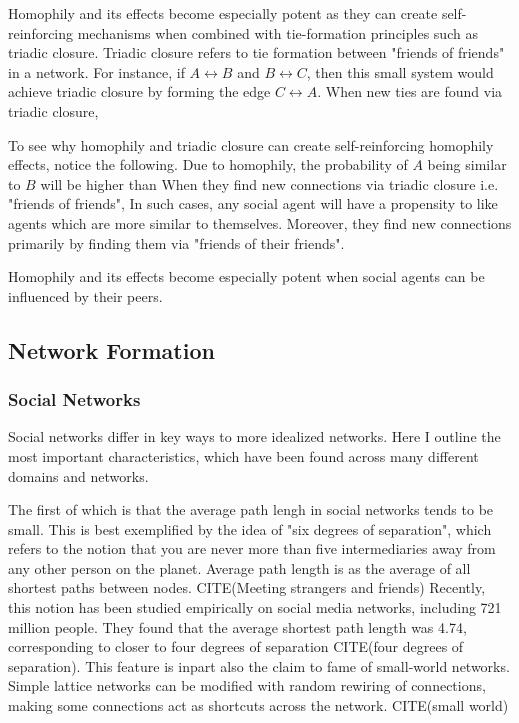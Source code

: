 \documentclass[9pt,twocolumn,twoside]{ilcss}
\begin{document}
Homophily and its effects become especially potent as they can create self-reinforcing mechanisms when combined with tie-formation principles such as triadic closure. 
Triadic closure refers to tie formation between "friends of friends" in a network. For instance, if $A \leftrightarrow B$ and $B \leftrightarrow C$, then this small system would achieve triadic closure by forming the edge $C \leftrightarrow A$. 
When new ties are found via triadic closure, 

To see why homophily and triadic closure can create self-reinforcing homophily effects, notice the following. Due to homophily, the probability of $A$ being similar to $B$ will be higher than
When they find new connections via triadic closure i.e. "friends of friends", 
In such cases, any social agent will have a propensity to like agents which are more similar to themselves. Moreover, they find new connections primarily by finding them via "friends of their friends". 

Homophily and its effects become especially potent when social agents can be influenced by their peers. 

\subsection{Network Formation}

\subsubsection{Social Networks}
Social networks differ in key ways to more idealized networks. 
Here I outline the most important characteristics, which have been found across many different domains and networks.

The first of which is that the average path lengh in social networks tends to be small. 
This is best exemplified by the idea of "six degrees of separation", which refers to the notion that you are never more than five intermediaries away from any other person on the planet. 
Average path length is as the average of all shortest paths between nodes. CITE(Meeting strangers and friends) 
Recently, this notion has been studied empirically on social media networks, including 721 million people.
They found that the average shortest path length was 4.74, corresponding to closer to four degrees of separation CITE(four degrees of separation).
This feature is inpart also the claim to fame of small-world networks. Simple lattice networks can be modified with random rewiring of connections, making some connections act as shortcuts across the network. CITE(small world)
\end{document}
